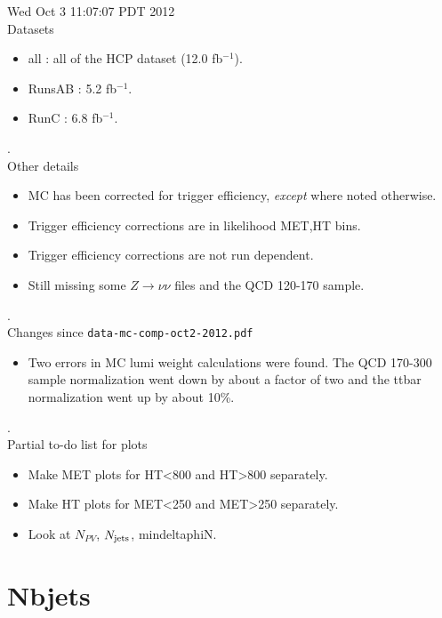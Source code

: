 \documentclass[11pt]{article}
\begin{document}
   Wed Oct  3 11:07:07 PDT 2012 \\

   Datasets
   \begin{itemize}
     \item all : all of the HCP dataset (12.0 fb$^{-1}$).
     \item RunsAB : 5.2 fb$^{-1}$.
     \item RunC : 6.8 fb$^{-1}$.
   \end{itemize}

.\\

   Other details
   \begin{itemize}
     \item MC has been corrected for trigger efficiency, {\it except} where noted otherwise.
     \item Trigger efficiency corrections are in likelihood MET,HT bins.
     \item Trigger efficiency corrections are not run dependent.
     \item Still missing some $Z\to \nu\nu$ files and the QCD 120-170 sample.
   \end{itemize}

.\\

   Changes since {\tt data-mc-comp-oct2-2012.pdf}
   \begin{itemize}
     \item Two errors in MC lumi weight calculations were found.  The QCD 170-300 sample
            normalization went down by about a factor of two and the ttbar
            normalization went up by about 10\%.
   \end{itemize}

.\\

   Partial to-do list for plots
   \begin{itemize}
     \item Make MET plots for HT<800 and HT>800 separately.
     \item Make HT plots for MET<250 and MET>250 separately.
     \item Look at $N_{PV}$, $N_{\rm jets}$, mindeltaphiN.
   \end{itemize}

  \clearpage
  \tableofcontents


    \clearpage
    \section{Nbjets}
\end{document}
